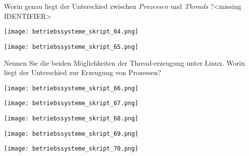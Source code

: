 \documentclass{article}
\begin{document}
\begin{tcolorbox}[colback=white!10!white,colframe=lightgray!75!black,
  savelowerto=\jobname_ex.tex,breakable,enhanced,lines before break=40]

\begin{center}
Worin genau liegt der Unterschied zwischen 
\textit{Prozessen
} und 
\textit{Threads
}?<missing IDENTIFIER>

\end{center}

\tcblower

\justifying
\begin{center}
\texttt{[image: betriebssysteme\_skript\_64.png]}
\end{center}
\begin{center}
\texttt{[image: betriebssysteme\_skript\_65.png]}
\end{center}

\end{tcolorbox}
\begin{tcolorbox}[colback=white!10!white,colframe=lightgray!75!black,
  savelowerto=\jobname_ex.tex,breakable,enhanced,lines before break=40]

\begin{center}
Nennen Sie die beiden Möglichkeiten der Thread-erzeugung unter Linux. 
Worin liegt der Unterschied zur Erzeugung von Prozessen?

\end{center}

\tcblower

\justifying
\begin{center}
\texttt{[image: betriebssysteme\_skript\_66.png]}
\end{center}
\begin{center}
\texttt{[image: betriebssysteme\_skript\_67.png]}
\end{center}
\begin{center}
\texttt{[image: betriebssysteme\_skript\_68.png]}
\end{center}
\begin{center}
\texttt{[image: betriebssysteme\_skript\_69.png]}
\end{center}
\begin{center}
\texttt{[image: betriebssysteme\_skript\_70.png]}
\end{center}

\end{tcolorbox}
\end{document}
